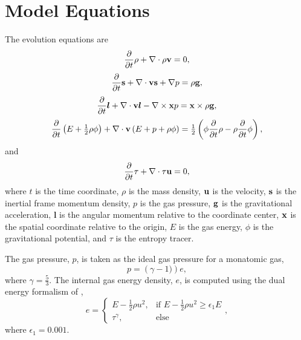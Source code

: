 \documentclass{aastex63}
\begin{document}
\newcommand{\ddt}[1]{\frac{\partial}{\partial t} #1} 
\newcommand{\divergence}[1]{{\bf \nabla} \cdot #1}
\newcommand{\curl}[1]{{\bf \nabla} \times #1}
\newcommand{\gradient}[1]{{\bf \nabla} #1}
\newcommand{\vect}[1]{{\bf #1}}
\newcommand{\am}{\bm{l}}


\section{Model Equations}
The evolution equations are
\begin{equation}
\ddt{\rho}+\divergence{\rho\vect{v}}=0,
\label{rho}
\end{equation}
\begin{equation}
\ddt{\vect{s}}+\divergence{\vect{v}\vect{s} + \gradient{p}}=\rho \vect{g},
\label{rhou}
\end{equation}
\begin{equation}
\ddt{\am}+\divergence{\vect{v}\am - \curl{\vect{x} p}}=\vect{x}\times\rho \vect{g},
\label{am}
\end{equation}
\begin{equation}
\ddt{\left(E+\tfrac{1}{2}\rho\phi\right)}+\divergence{\vect{v}\left(E+p+\rho\phi\right)}=\tfrac{1}{2}\left(\phi\ddt{\rho}-\rho\ddt{\phi}\right),
\label{E}
\end{equation}
and
\begin{equation}
\ddt{\tau}+\divergence{\tau\vect{u}}=0,
\label{tau}
\end{equation}
where $t$ is the time coordinate, $\rho$ is the mass density, $\vect{u}$ is the velocity, $\vect{s}$ is the inertial frame momentum density, $p$ is the gas pressure, 
$\vect{g}$ is the gravitational acceleration, 
$\am$ is the angular momentum relative to the coordinate center, 
$\vect{x}$ is the spatial coordinate relative to the origin, 
$E$ is the gas energy, $\phi$ is the gravitational potential, 
and $\tau$ is the entropy tracer.

The gas pressure, $p$, is taken as the ideal gas pressure for a monatomic gas, 
\begin{equation}
p = \left( \gamma - 1 ) \right) e, 
\end{equation}
where $\gamma = \tfrac{5}{3}$. The internal gas energy density, $e$, is computed using the dual energy formalism of \cite{BRYAN1995},
\begin{equation}
    e = 
\begin{cases}
    E - \tfrac{1}{2} \rho u^2, & \text{if } E - \tfrac{1}{2} \rho u^2 \geq \epsilon_1 E\\
    \tau^{\gamma},             & \text{else}
\end{cases},
\end{equation}
where $\epsilon_1 = 0.001$.
\end{document}
